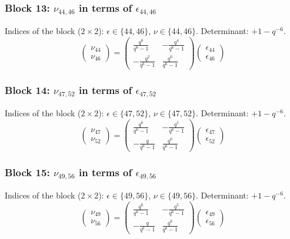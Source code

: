 \subsubsection{Block 13: $\nu_{44, 46}$ in terms of $\epsilon_{44, 46}$}
Indices of the block ($2\times 2$): $\epsilon \in \{44, 46\}$, $\nu \in \{44, 46\}$.
Determinant: $+1-q^{-6}$.
\[
\begin{pmatrix}
\nu_{44} \\
\nu_{46}
\end{pmatrix}
=
\begin{pmatrix}
\frac{q^{6}}{q^{6}-1} & -\frac{q^{4}}{q^{6}-1} \\
-\frac{q^{2}}{q^{6}-1} & \frac{q^{6}}{q^{6}-1}
\end{pmatrix}
\begin{pmatrix}
\epsilon_{44} \\
\epsilon_{46}
\end{pmatrix}
\]

\subsubsection{Block 14: $\nu_{47, 52}$ in terms of $\epsilon_{47, 52}$}
Indices of the block ($2\times 2$): $\epsilon \in \{47, 52\}$, $\nu \in \{47, 52\}$.
Determinant: $+1-q^{-6}$.
\[
\begin{pmatrix}
\nu_{47} \\
\nu_{52}
\end{pmatrix}
=
\begin{pmatrix}
\frac{q^{6}}{q^{6}-1} & -\frac{q^{5}}{q^{6}-1} \\
-\frac{q}{q^{6}-1} & \frac{q^{6}}{q^{6}-1}
\end{pmatrix}
\begin{pmatrix}
\epsilon_{47} \\
\epsilon_{52}
\end{pmatrix}
\]

\subsubsection{Block 15: $\nu_{49, 56}$ in terms of $\epsilon_{49, 56}$}
Indices of the block ($2\times 2$): $\epsilon \in \{49, 56\}$, $\nu \in \{49, 56\}$.
Determinant: $+1-q^{-6}$.
\[
\begin{pmatrix}
\nu_{49} \\
\nu_{56}
\end{pmatrix}
=
\begin{pmatrix}
\frac{q^{6}}{q^{6}-1} & -\frac{q^{5}}{q^{6}-1} \\
-\frac{q}{q^{6}-1} & \frac{q^{6}}{q^{6}-1}
\end{pmatrix}
\begin{pmatrix}
\epsilon_{49} \\
\epsilon_{56}
\end{pmatrix}
\]


